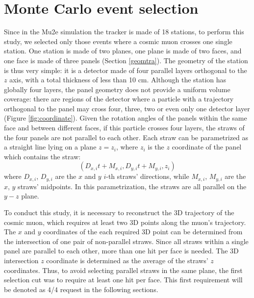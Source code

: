 \section{Monte Carlo event selection}\label{eventselection}

Since in the Mu2e simulation the tracker is made of 18 stations, to 
perform this study, we selected only those events where a cosmic 
muon crosses one single station.
One station is made of two planes, one plane is made of two faces, and one face is
made of three panels (Section \ref{geomtra}). The geometry of the station 
is thus very simple: it is a detector made of four parallel 
layers orthogonal to the $z$ axis, with a total thickness of less than 10 cm.
Although the station has globally four layers, 
the panel geometry does not provide a uniform
volume coverage: there are regions of the 
detector where a particle with a trajectory orthogonal
to the panel may cross four, three, two or even only one 
detector layer (Figure \ref{fig:coordinate}). Given the
rotation angles of the panels within the same 
face and between different faces, if this particle
crosses four layers, the straws of the four 
panels are not parallel to each other.
Each straw can be parametrized as a straight line 
lying on a plane $z = z_i$, where $z_i$ is the $z$ 
coordinate of the panel which contains the straw:
\begin{equation}\label{equaretta}
    (D_{x,i}t+M_{x,i},D_{y,i}t+M_{y,i},z_i)
\end{equation}
where $D_{x,i}$, $D_{y,i}$ are the $x$ and $y$ 
$i$-th straws' directions, while $M_{x,i}$, $M_{y,i}$ 
are the $x$, $y$ straws' midpoints.
In this parametrization, the straws are all parallel 
on the $y-z$ plane.

To conduct this study, it is necessary to 
reconstruct the 3D trajectory of the cosmic muon, 
which requires at least two 3D points along the muon's 
trajectory. The $x$ and $y$ coordinates of 
the each required 3D point can be determined 
from the intersection of one pair of non-parallel 
straws. Since all straws 
within a single panel are parallel to each other, 
more than one hit per face is needed. The 3D intersection $z$ 
coordinate is determined as the average of the 
straws' $z$ coordinates. Thus, to avoid selecting 
parallel straws in the same plane, 
the first selection cut 
was to require at least one hit per face. 
This first requirement will be denoted as 
4/4 request in the following sections.

